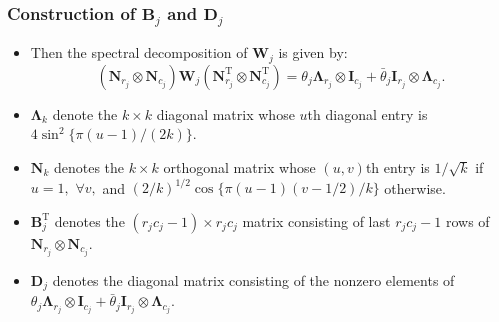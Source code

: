 \documentclass{beamer}
\newcommand{\bB}{\mathbf{B}}
\newcommand{\bD}{\mathbf{D}}
\newcommand{\bLambda}{{\bm\Lambda}}
\newcommand{\bN}{\mathbf{N}}
\newcommand{\bW}{\mathbf{W}}
\newcommand{\sT}{\mathrm{T}}
\begin{document}
\begin{frame}
	\frametitle{Construction of $\bB_{j}$ and $\bD_j$}

  	\begin{itemize}
         \item Then the spectral decomposition of $\bW_j$ is given by:
         $$( \bN_{r_j}\otimes\bN_{c_j}) \bW_j ( \bN_{r_j}^\sT \otimes\bN_{c_j}^\sT) = \theta_j\bLambda_{r_j}\otimes\mathbf{I}_{c_j} + \bar\theta_j\mathbf{I}_{r_j}\otimes\bLambda_{c_j}.$$
         \item $\bLambda_k$ denote the $k\times k$ diagonal matrix  whose $u$th diagonal entry is $4\sin^2\{\pi(u-1)/(2k)\}.$
	\item $\bN_k$ denotes the $k\times k$ orthogonal matrix whose $(u,v)$th entry is $1/\sqrt{k}$ if $u=1,$ $\forall v,$ and $(2/k)^{1/2}\cos\{\pi(u-1)(v-1/2)/k\}$ otherwise.
	\item  $\bB_{j}^{\sT}$ denotes the $(r_jc_j-1)\times r_jc_j$ matrix consisting of last $r_jc_j-1$ rows of $ \bN_{r_j}\otimes\bN_{c_j}$.
         \item $\bD_j$ denotes the diagonal matrix consisting of the nonzero elements of $\theta_j\bLambda_{r_j}\otimes\mathbf{I}_{c_j} + \bar\theta_j\mathbf{I}_{r_j}\otimes\bLambda_{c_j}$.
	\end{itemize}
	
\end{frame}
\end{document}
